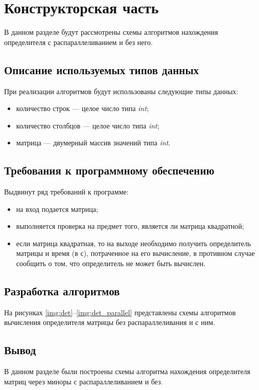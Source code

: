 
\chapter{Конструкторская часть}
В данном разделе будут рассмотрены схемы алгоритмов нахождения определителя с распараллеливанием и без него.

\section{Описание используемых типов данных}

При реализации алгоритмов будут использованы следующие типы данных:
\begin{itemize}[label=---]
	\item количество строк — целое число типа \textit{int};
	\item количество столбцов — целое число типа \textit{int};
	\item матрица — двумерный массив значений типа \textit{int}.
\end{itemize}

\section{Требования к программному обеспечению}
Выдвинут ряд требований к программе:
\begin{itemize}[label=---]
	\item на вход подается матрица;
    \item выполняется проверка на предмет того, является ли матрица квадратной;
    \item если матрица квадратная, то на выходе необходимо получить определитель матрицы и время (в с), потраченное на его вычисление, в противном случае сообщить о том, что определитель не может быть вычислен.
\end{itemize}

\section{Разработка алгоритмов}
На рисунках \ref{img:det}--\ref{img:det_parallel} представлены схемы алгоритмов вычисления определителя матрицы без распараллеливания и с ним.
\clearpage

\section*{Вывод}

В данном разделе были построены схемы алгоритма нахождения определителя матриц через миноры с распараллеливанием и без.
